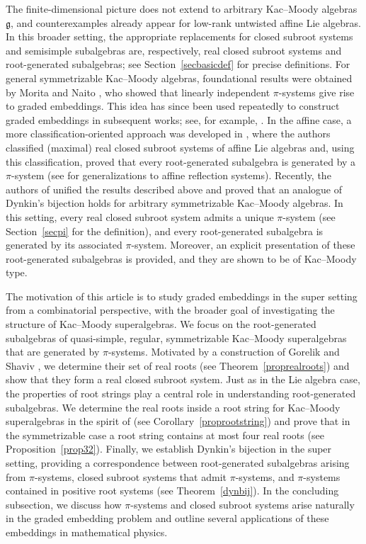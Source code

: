 \documentclass[11pt,reqno]{amsart}
\theoremstyle{plain}
\theoremstyle{definition}
\theoremstyle{remark}
\newcommand{\lie}[1]{\mathfrak{#1}}
\numberwithin{equation}{section}
\begin{document}
The finite-dimensional picture does not extend to arbitrary Kac–Moody algebras $\lie g$, and counterexamples already appear for low-rank untwisted affine Lie algebras. In this broader setting, the appropriate replacements for closed subroot systems and semisimple subalgebras are, respectively, real closed subroot systems and root-generated subalgebras; see Section~\ref{secbasicdef} for precise definitions. For general symmetrizable Kac–Moody algebras, foundational results were obtained by Morita \cite{morita1989certain} and Naito \cite{naito1992regular}, who showed that linearly independent $\pi$-systems give rise to graded embeddings. This idea has since been used repeatedly to construct graded embeddings in subsequent works; see, for example, \cite{feingold2004subalgebras,habib2024pisystems,viswanath08embedding}. In the affine case, a more classification-oriented approach was developed in \cite{roy2019maximal}, where the authors classified (maximal) real closed subroot systems of affine Lie algebras and, using this classification, proved that every root-generated subalgebra is generated by a $\pi$-system (see \cite{habib2024maximal,KV21a} for generalizations to affine reflection systems).
Recently, the authors of \cite{idv2023root} unified the results described above and proved that an analogue of Dynkin’s bijection holds for arbitrary symmetrizable Kac–Moody algebras. In this setting, every real closed subroot system admits a unique $\pi$-system (see Section~\ref{secpi} for the definition), and every root-generated subalgebra is generated by its associated $\pi$-system. Moreover, an explicit presentation of these root-generated subalgebras is provided, and they are shown to be of Kac–Moody type.

The motivation of this article is to study graded embeddings in the super setting from a combinatorial perspective, with the broader goal of investigating the structure of Kac–Moody superalgebras. We focus on the root-generated subalgebras of quasi-simple, regular, symmetrizable Kac–Moody superalgebras that are generated by $\pi$-systems. Motivated by a construction of Gorelik and Shaviv \cite{gorelik17generalized}, we determine their set of real roots (see Theorem~\ref{proprealroots}) and show that they form a real closed subroot system. Just as in the Lie algebra case, the properties of root strings play a central role in understanding root-generated subalgebras. We determine the real roots inside a root string for Kac–Moody superalgebras in the spirit of \cite{billig1995root,morita1988root} (see Corollary~\ref{proprootstring}) and prove that in the symmetrizable case a root string contains at most four real roots (see Proposition~\ref{prop32}). Finally, we establish Dynkin’s bijection in the super setting, providing a correspondence between root-generated subalgebras arising from $\pi$-systems, closed subroot systems that admit $\pi$-systems, and $\pi$-systems contained in positive root systems (see Theorem~\ref{dynbij}). In the concluding subsection, we discuss how $\pi$-systems and closed subroot systems arise naturally in the graded embedding problem and outline several applications of these embeddings in mathematical physics.
\end{document}
